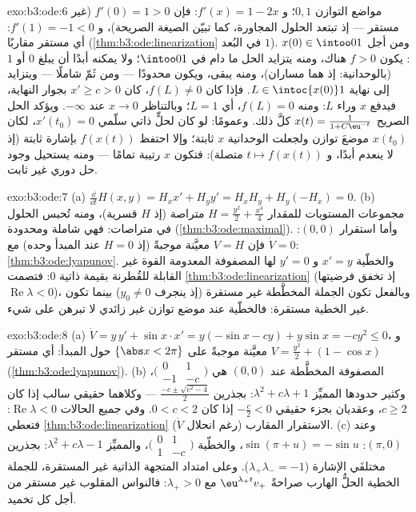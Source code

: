 \begin{solution}{exo:b3:ode:6}
مواضع التوازن $0, 1$؛ و $f'(x) = 1 - 2x$: فإن $f'(0) = 1 > 0$
(غير مستقر --- إذ تبتعد الحلول المجاورة، كما تبيّن الصيغة
الصريحة)، و $f'(1) = -1 < 0$: أي مستقر مقاربًا (\cref{thm:b3:ode:linearization} في
البُعد $1$). ومن أجل $x(0) \in \intoo01$: يكون $f > 0$ هناك، ومنه يتزايد
الحل ما دام في $\intoo01$؛ ولا يمكنه أبدًا أن يبلغ $0$ أو $1$
(بالوحدانية: إذ هما مساران)، ومنه يبقى، ويكون محدودًا --- ومن
ثَمّ شاملًا --- ويتزايد إلى نهاية $L
\in \intoc{x(0)}1$. فإذا كان
$f(L) \neq 0$، كان $x' \geq c > 0$ بجوار النهاية، فيدفع $x$
وراء $L$: ومنه $f(L) = 0$، أي $L = 1$؛ وبالتناظر $x \to 0$ عند
$-\infty$. ويؤكد الحل الصريح $x(t) =
\frac1{1 + C\eu^{-t}}$ كلَّ ذلك. وعمومًا: لو كان
لحلٍّ ذاتي سلّمي $x'(t_0) = 0$، لكان $x(t_0)$ موضعَ توازن
ولجعلت الوحدانية $x$ ثابتة؛ وإلا احتفظ $f(x(t))$ بإشارة ثابتة
(إذ لا ينعدم أبدًا، و $t \mapsto f(x(t))$ متصلة): فتكون $x$ رتيبة تمامًا
--- ومنه يستحيل وجود حل دوري غير ثابت.
\end{solution}

\begin{solution}{exo:b3:ode:7}
(a) $\frac{\dd}{\dd t}H(x,y) = H_xx' + H_yy' = H_xH_y +
H_y(-H_x) = 0$.
(b) مجموعات المستويات للمقدار $H = \frac{y^2}2 + \frac{x^4}4$ متراصة (إذ $H$ قسرية)،
ومنه تُحبس الحلول في متراصات: فهي شاملة ومحدودة (\cref{thm:b3:ode:maximal}).
وأما استقرار $(0,0)$: فإن $V = H$ معيَّنة موجبةً (إذ $H = 0$
عند المبدأ وحده) مع $\dot V = 0$: \cref{thm:b3:ode:lyapunov}. والخطّية $x' = y$
و $y' = 0$ لها المصفوفة المعدومة القوة غير القابلة للقُطرنة
بقيمة ذاتية $0$: فتصمت \cref{thm:b3:ode:linearization} (إذ تخفق فرضيتها $\operatorname{Re}\lambda < 0$)،
وبالفعل تكون الجملة المخطَّطة غير مستقرة (إذ ينجرف
$y_0 \ne 0$) بينما تكون غير الخطية مستقرة: فالخطّية عند موضع
توازن غير زائدي لا تبرهن على شيء.
\end{solution}

\begin{solution}{exo:b3:ode:8}
(a) $\dot V = y\,y' + \sin x\cdot x' = y(-\sin x - cy) +
y\sin x = -cy^2 \leq 0$، و $V = \frac{y^2}2 + (1 - \cos x)$ معيَّنة موجبةً على $\{\abs x < 2\pi\}$ حول المبدأ: أي
مستقر (\cref{thm:b3:ode:lyapunov}).
(b) المصفوفة المخطَّطة عند $(0,0)$ هي $\bigl(\begin{smallmatrix}0 & 1\\ -1 &
-c\end{smallmatrix}\bigr)$، وكثير حدودها
المميِّز $\lambda^2 + c\lambda + 1$: بجذرين $\frac{-c \pm \sqrt{c^2 -
4}}2$ --- وكلاهما حقيقي سالب إذا كان
$c \geq 2$، وعقديان بجزء حقيقي $-\frac c2 < 0$ إذا كان
$0 < c < 2$. وفي جميع الحالات $\operatorname{Re}\lambda < 0$: فتعطي \cref{thm:b3:ode:linearization} الاستقرار
المقارب (رغم انحلال $\dot V$).
(c) وعند $(\pi, 0)$: $\sin(\pi + u) = -\sin u$، والخطّية $\bigl(\begin{smallmatrix}0&1\\1&-c\end{smallmatrix}\bigr)$، والمميِّز $\lambda^2 + c\lambda - 1$:
بجذرين مختلفَي الإشارة ($\lambda_+\lambda_- = -1$). وعلى امتداد المتجهة الذاتية
غير المستقرة، للجملة الخطية الحلُّ الهارب صراحةً $\eu^{\lambda_+t}v_+$ مع
$\lambda_+ > 0$: فالنواس المقلوب غير مستقر من أجل كل تخميد.
\end{solution}

